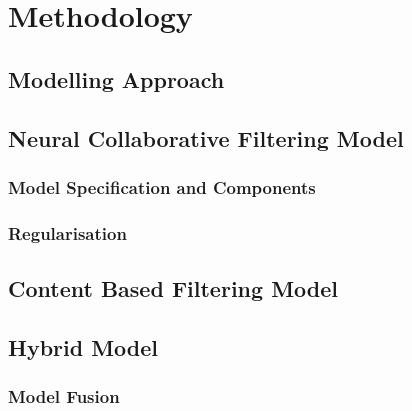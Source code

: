 
\chapter{Methodology} %

\label{Chapter4} %


\section{Modelling Approach}
\label{chp4-sec1}


\section{Neural Collaborative Filtering Model}
\label{chp4-sec2}

\subsection{Model Specification and Components}
\label{chp4-sec2.1}

\subsection{Regularisation}
\label{chp4-sec2.2}


\section{Content Based Filtering Model}
\label{chp4-sec3}



\section{Hybrid Model}
\label{chp4-sec4}

\subsection{Model Fusion}
\label{chp4-sec4.1}


